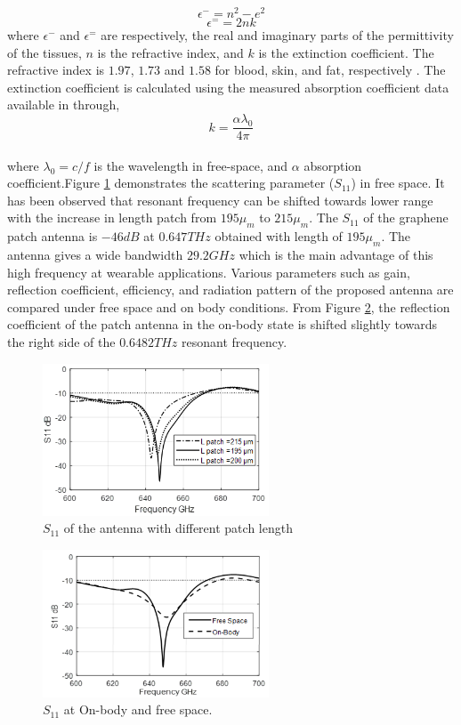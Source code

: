 \documentclass[12pt]{suhbook}
\begin{document}
$$\epsilon^- =n^2-e^2$$
$$\epsilon^= =2nk$$
where $\epsilon^-$ and $\epsilon^=$ are respectively, the real and imaginary parts of the permittivity of the tissues, $n$ is the refractive index, and $k$ is the extinction coefficient. The refractive index is $1.97$, $1.73$ and $1.58$ for blood, skin, and fat, respectively \cite{yang2015numerical}. The extinction coefficient is calculated using the measured absorption coefficient data available in \cite{fitzgerald2003catalogue} \cite{berry2003optical} through,
$$k=\frac{\alpha\lambda_0}{4\pi}$$
\\where $\lambda_0 = c/f$ is the wavelength in free-space, and $\alpha$  absorption coefficient.Figure \ref{Fig 8AE} demonstrates the scattering parameter ($S_{11}$) in free space. It has been observed that resonant frequency can be shifted towards lower range with the increase in length patch from $195 \mu_m $ to $ 215 \mu_m$. The $S_{11}$ of the graphene patch antenna is $-46 dB$ at $0.647 THz$ obtained with length of $195 \mu_m$. The antenna gives a wide bandwidth $29.2 GHz$ which is the main advantage of this high frequency at wearable applications. Various parameters such as gain, reflection coefficient, efficiency, and radiation pattern of the proposed antenna are compared under free space and on body conditions. From Figure \ref{Fig 8B}, the reflection coefficient of the patch antenna in the on-body state is shifted slightly towards the right side of the $0.6482 THz$ resonant frequency.
\begin{figure}[hbt!]
    \centering
    \includegraphics[width=0.6\textwidth]{9}
    \caption{$S_{11}$ of the antenna with different patch length}
    \label{Fig 8AE}
\end{figure}
\begin{figure}[hbt!]
    \centering
    \includegraphics[width=0.6\textwidth]{10}
    \caption{$S_{11}$ at On-body and free space.}
    \label{Fig 8B}
\end{figure}
\end{document}
